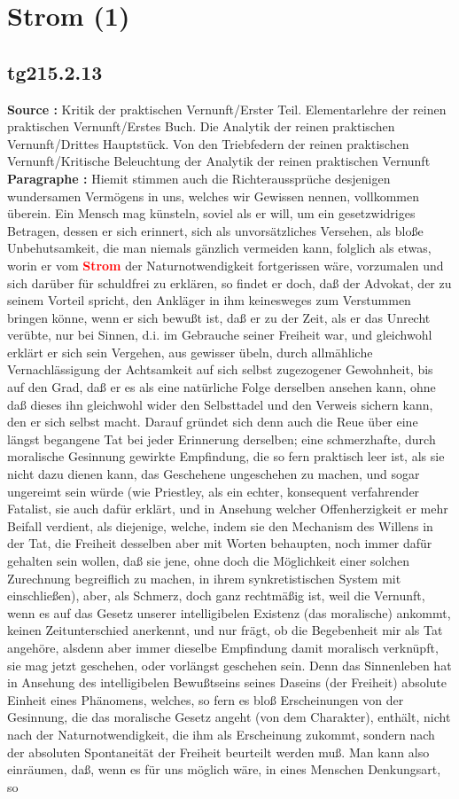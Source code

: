 \documentclass[a4paper,12pt,twoside]{book}
\newcommand{\match}[1]{\textcolor{red}{\textbf{#1}}}
\newcommand{\unnumberedsection}[1]{
	\section*{#1}
	\addcontentsline{toc}{section}{#1}
	\markright{#1}
}
\begin{document}
	\unnumberedsection{Strom (1)} 
	\subsection*{tg215.2.13} 
	\textbf{Source : }Kritik der praktischen Vernunft/Erster Teil. Elementarlehre der reinen praktischen Vernunft/Erstes Buch. Die Analytik der reinen praktischen Vernunft/Drittes Hauptstück. Von den Triebfedern der reinen praktischen Vernunft/Kritische Beleuchtung der Analytik der reinen praktischen Vernunft\\  
	
	\textbf{Paragraphe : }Hiemit stimmen auch die Richteraussprüche desjenigen wundersamen Vermögens in uns, welches wir Gewissen nennen, vollkommen überein. Ein Mensch mag künsteln, soviel als er will, um ein gesetzwidriges Betragen, dessen er sich  erinnert, sich als unvorsätzliches Versehen, als bloße Unbehutsamkeit, die man niemals gänzlich vermeiden kann, folglich als etwas, worin er vom \match{Strom} der Naturnotwendigkeit fortgerissen wäre, vorzumalen und sich darüber für schuldfrei zu erklären, so findet er doch, daß der Advokat, der zu seinem Vorteil spricht, den Ankläger in ihm keinesweges zum Verstummen bringen könne, wenn er sich bewußt ist, daß er zu der Zeit, als er das Unrecht verübte, nur bei Sinnen, d.i. im Gebrauche seiner Freiheit war, und gleichwohl erklärt er sich sein Vergehen, aus gewisser übeln, durch allmähliche Vernachlässigung der Achtsamkeit auf sich selbst zugezogener Gewohnheit, bis auf den Grad, daß er es als eine natürliche Folge derselben ansehen kann, ohne daß dieses ihn gleichwohl wider den Selbsttadel und den Verweis sichern kann, den er sich selbst macht. Darauf gründet sich denn auch die Reue über eine längst begangene Tat bei jeder Erinnerung derselben; eine schmerzhafte, durch moralische Gesinnung gewirkte Empfindung, die so fern praktisch leer ist, als sie nicht dazu dienen kann, das Geschehene ungeschehen zu machen, und sogar ungereimt sein würde (wie Priestley, als ein echter, konsequent verfahrender Fatalist, sie auch dafür erklärt, und in Ansehung welcher Offenherzigkeit er mehr Beifall verdient, als diejenige, welche, indem sie den Mechanism des Willens in der Tat, die Freiheit desselben aber mit Worten behaupten, noch immer dafür gehalten sein wollen, daß sie jene, ohne doch die Möglichkeit einer solchen Zurechnung begreiflich zu machen, in ihrem synkretistischen System mit einschließen), aber, als Schmerz, doch ganz rechtmäßig ist, weil die Vernunft, wenn es auf das Gesetz unserer intelligibelen Existenz (das moralische) ankommt, keinen Zeitunterschied anerkennt, und nur frägt, ob die Begebenheit mir als Tat angehöre, alsdenn aber immer dieselbe Empfindung damit moralisch verknüpft, sie mag jetzt geschehen, oder vorlängst geschehen sein. Denn das Sinnenleben hat in Ansehung des intelligibelen Bewußtseins seines Daseins (der Freiheit) absolute Einheit eines Phänomens, welches, so fern es bloß Erscheinungen von der Gesinnung, die das moralische Gesetz angeht  (von dem Charakter), enthält, nicht nach der Naturnotwendigkeit, die ihm als Erscheinung zukommt, sondern nach der absoluten Spontaneität der Freiheit beurteilt werden muß. Man kann also einräumen, daß, wenn es für uns möglich wäre, in eines Menschen Denkungsart, so 
\end{document}

